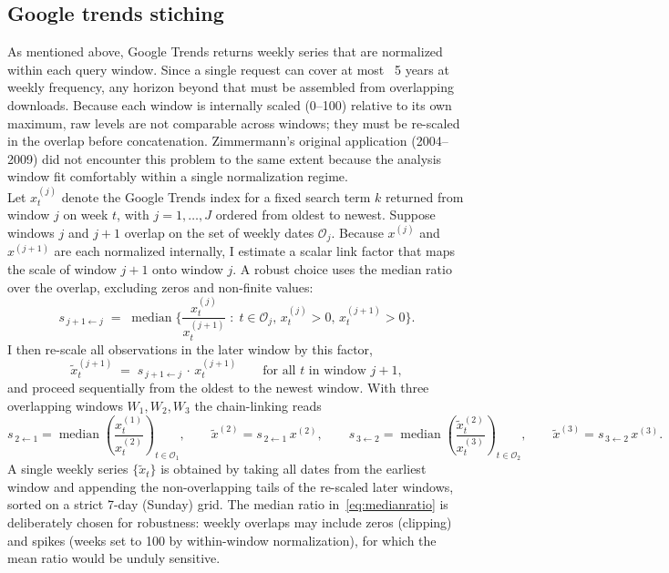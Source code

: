 \documentclass[12pt,a4paper]{article}
\begin{document}
\subsection{Google trends stiching}
As mentioned above, Google Trends returns weekly series that are normalized within each query window.
Since a single request can cover at most ~5 years at weekly frequency, any horizon beyond that must be assembled from overlapping downloads.
Because each window is internally scaled (0–100) relative to its own maximum, raw levels are not comparable across windows; they must be re-scaled in the overlap before concatenation.
Zimmermann’s original application (2004–2009) did not encounter this problem to the same extent because the analysis window fit comfortably within a single normalization regime.
\\
Let $x^{(j)}_{t}$ denote the Google Trends index for a fixed search term $k$ returned from window $j$ on week $t$, with $j=1,\dots,J$ ordered from oldest to newest. Suppose windows $j$ and $j{+}1$ overlap on the set of weekly dates $\mathcal{O}_{j}$. Because $x^{(j)}$ and $x^{(j+1)}$ are each normalized internally, I estimate a scalar link factor that maps the scale of window $j{+}1$ onto window $j$. A robust choice uses the median ratio over the overlap, excluding zeros and non-finite values:
\begin{equation}
s_{\,j{+}1 \leftarrow j}
\;=\;
\operatorname{median}
\Big\{
\frac{x^{(j)}_{t}}{x^{(j+1)}_{t}}
\;:\;
t \in \mathcal{O}_{j},\,
x^{(j)}_{t}>0,\,
x^{(j+1)}_{t}>0
\Big\}.
\label{eq:medianratio}
\end{equation}
I then re-scale all observations in the later window by this factor,
\begin{equation}
\tilde{x}^{(j+1)}_{t}
\;=\;
s_{\,j{+}1 \leftarrow j}\,\cdot\,x^{(j+1)}_{t}
\qquad
\text{for all } t \text{ in window } j{+}1,
\label{eq:rescale}
\end{equation}
and proceed sequentially from the oldest to the newest window. With three overlapping windows $W_{1},W_{2},W_{3}$ the chain-linking reads
\begin{equation}
s_{\,2 \leftarrow 1}
=
\operatorname{median}\!\left(\frac{x^{(1)}_{t}}{x^{(2)}_{t}}\right)_{t \in \mathcal{O}_{1}},
\qquad
\tilde{x}^{(2)} = s_{\,2 \leftarrow 1}\,x^{(2)},
\qquad
s_{\,3 \leftarrow 2}
=
\operatorname{median}\!\left(\frac{\tilde{x}^{(2)}_{t}}{x^{(3)}_{t}}\right)_{t \in \mathcal{O}_{2}},
\qquad
\tilde{x}^{(3)} = s_{\,3 \leftarrow 2}\,x^{(3)}.
\label{eq:chain}
\end{equation}
A single weekly series $\{\tilde{x}_{t}\}$ is obtained by taking all dates from the earliest window and appending the non-overlapping tails of the re-scaled later windows, sorted on a strict 7-day (Sunday) grid. The median ratio in~\eqref{eq:medianratio} is deliberately chosen for robustness: weekly overlaps may include zeros (clipping) and spikes (weeks set to 100 by within-window normalization), for which the mean ratio would be unduly sensitive.\\
\end{document}

